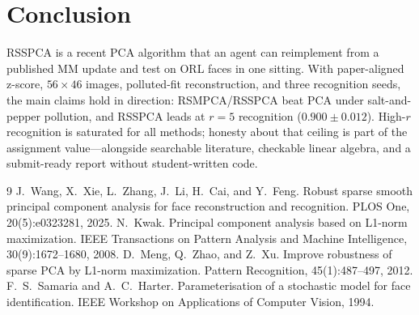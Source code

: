 \documentclass[11pt,a4paper]{article}
\begin{document}
\section{Conclusion}
RSSPCA is a recent PCA algorithm that an agent can reimplement from a published MM update and test on ORL faces in one sitting.
With paper-aligned z-score, $56\times 46$ images, polluted-fit reconstruction, and three recognition seeds, the main claims hold in direction: RSMPCA/RSSPCA beat PCA under salt-and-pepper pollution, and RSSPCA leads at $r{=}5$ recognition ($0.900{\pm}0.012$).
High-$r$ recognition is saturated for all methods; honesty about that ceiling is part of the assignment value---alongside searchable literature, checkable linear algebra, and a submit-ready report without student-written code.

\begin{thebibliography}{9}
J.~Wang, X.~Xie, L.~Zhang, J.~Li, H.~Cai, and Y.~Feng.
Robust sparse smooth principal component analysis for face reconstruction and recognition.
PLOS One, 20(5):e0323281, 2025.
N.~Kwak.
Principal component analysis based on L1-norm maximization.
IEEE Transactions on Pattern Analysis and Machine Intelligence, 30(9):1672--1680, 2008.
D.~Meng, Q.~Zhao, and Z.~Xu.
Improve robustness of sparse PCA by L1-norm maximization.
Pattern Recognition, 45(1):487--497, 2012.
F.~S.~Samaria and A.~C.~Harter.
Parameterisation of a stochastic model for face identification.
IEEE Workshop on Applications of Computer Vision, 1994.
\end{thebibliography}
\end{document}
